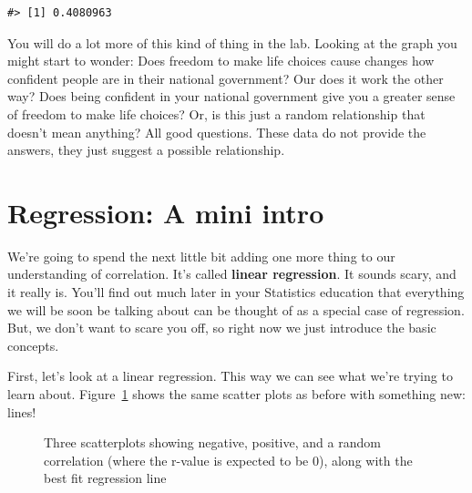 \documentclass[
  letterpaper,
  DIV=11,
  numbers=noendperiod]{scrreprt}
\begin{document}
\begin{verbatim}
#> [1] 0.4080963
\end{verbatim}

You will do a lot more of this kind of thing in the lab. Looking at the
graph you might start to wonder: Does freedom to make life choices cause
changes how confident people are in their national government? Our does
it work the other way? Does being confident in your national government
give you a greater sense of freedom to make life choices? Or, is this
just a random relationship that doesn't mean anything? All good
questions. These data do not provide the answers, they just suggest a
possible relationship.

\section{Regression: A mini intro}\label{regression-a-mini-intro}

We're going to spend the next little bit adding one more thing to our
understanding of correlation. It's called \textbf{linear regression}. It
sounds scary, and it really is. You'll find out much later in your
Statistics education that everything we will be soon be talking about
can be thought of as a special case of regression. But, we don't want to
scare you off, so right now we just introduce the basic concepts.

First, let's look at a linear regression. This way we can see what we're
trying to learn about. Figure~\ref{fig-3regression} shows the same
scatter plots as before with something new: lines!

\begin{figure}


\caption{\label{fig-3regression}Three scatterplots showing negative,
positive, and a random correlation (where the r-value is expected to be
0), along with the best fit regression line}

\end{figure}%
\end{document}
